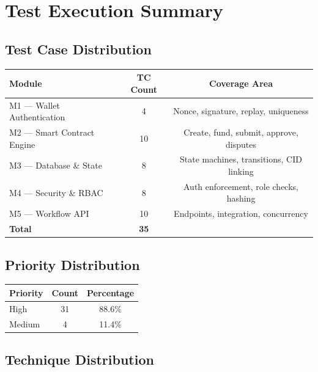 \documentclass[12pt,a4paper]{article}
\begin{document}
\newpage

\section{Test Execution Summary}

\subsection{Test Case Distribution}

\begin{tabular}{lcc}
\toprule
\textbf{Module} & \textbf{TC Count} & \textbf{Coverage Area} \\
\midrule
M1 --- Wallet Authentication     & 4  & Nonce, signature, replay, uniqueness \\
M2 --- Smart Contract Engine      & 10 & Create, fund, submit, approve, disputes \\
M3 --- Database \& State          & 8  & State machines, transitions, CID linking \\
M4 --- Security \& RBAC          & 8  & Auth enforcement, role checks, hashing \\
M5 --- Workflow API               & 10 & Endpoints, integration, concurrency \\
\midrule
\textbf{Total}                   & \textbf{35} & \\
\bottomrule
\end{tabular}

\vspace{0.5cm}

\subsection{Priority Distribution}

\begin{tabular}{lcc}
\toprule
\textbf{Priority} & \textbf{Count} & \textbf{Percentage} \\
\midrule
High   & 31 & 88.6\% \\
Medium &  4 & 11.4\% \\
\bottomrule
\end{tabular}

\vspace{0.5cm}

\subsection{Technique Distribution}
\end{document}
